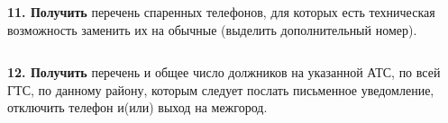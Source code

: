 \documentclass{report}
\begin{document}
\textbf{11. Получить} перечень спаренных телефонов, для которых есть 
техническая возможность заменить их на обычные (выделить дополнительный номер).

\begin{lstlisting}

\end{lstlisting}

\textbf{12. Получить} перечень и общее число должников на указанной АТС, 
по всей ГТС, по данному району, которым следует послать письменное уведомление, 
отключить телефон и(или) выход на межгород.

\begin{lstlisting}

\end{lstlisting}
\end{document}

